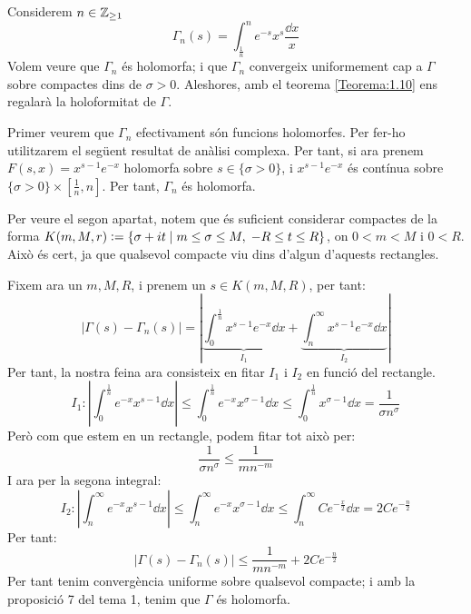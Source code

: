 \begin{pf}
    Considerem $n\in \mathbb Z_{\geq1}$
    \[
    \Gamma_n(s)=\int_{\frac{1}{n}}^n e^{-s}x^s\frac{\dd x}{x}
    \]
    Volem veure que $\Gamma_n$ és holomorfa; i que $\Gamma_n$ convergeix uniformement cap a $\Gamma$ sobre compactes dins de $\sigma>0$. Aleshores, amb el teorema \ref{Teorema:1.10} ens regalarà la holoformitat de $\Gamma$.\par
    \vspace{10mm}
    Primer veurem que $\Gamma _n$ efectivament són funcions holomorfes. Per fer-ho utilitzarem el següent resultat de anàlisi complexa.
    Per tant, si ara prenem $F(s,x)=x^{s-1}e^{-x}$ holomorfa sobre $s\in\{\sigma>0\}$, i $x^{s-1}e^{-x}$ és contínua sobre $\{\sigma>0\}\times[\frac{1}{n},n]$. Per tant, $\Gamma_n$ és holomorfa.\par
    \vspace{10mm}

    Per veure el segon apartat, notem que és suficient considerar compactes de la forma $K(m,M,r)\vcentcolon=\{\sigma+it\;|\;m\leq \sigma \leq M,\; -R\leq t\leq R\}$, on $0<m<M$ i $0<R$. Això és cert, ja que qualsevol compacte viu dins d'algun d'aquests rectangles.\par
    Fixem ara un $m,M,R$, i prenem un $s\in K(m,M,R)$, per tant:
    \[
    \left|\Gamma(s)-\Gamma_n(s)\right|=
    \left|\underbrace{\int_0^\frac{1}{n} x^{s-1}e^{-x}\dd x}_{I_1}+\underbrace{\int_n^\infty x^{s-1}e^{-x}\dd x}_{I_2}\right|
    \]
    Per tant, la nostra feina ara consisteix en fitar $I_1$ i $I_2$ en funció del rectangle.
    \[
    I_1:\left|\int_0^{\frac{1}{n}}e^{-x}x^{s-1}\dd x\right|\leq
    \int_0^{\frac{1}{n}}e^{-x}x^{\sigma-1}\dd x\leq 
    \int_0^{\frac{1}{n}}x^{\sigma-1}\dd x=\frac{1}{\sigma n^{\sigma}}
    \]
    Però com que estem en un rectangle, podem fitar tot això per:
    \[
    \frac{1}{\sigma n^{\sigma}}\leq \frac{1}{mn^{-m}}
    \]
    I ara per la segona integral:
    \[
    I_2:\left|\int_{n}^\infty e^{-x}x^{s-1}\dd x\right|\leq
    \int_{n}^\infty e^{-x}x^{\sigma-1}\dd x\leq
    \int_n^\infty Ce^{-\frac{x}{2}}\dd x=2Ce^{-\frac{n}{2} }
    \]
    Per tant: 
    \[
    |\Gamma(s)-\Gamma_n(s)|\leq \frac{1}{mn^{-m}}+2Ce^{-\frac{n}{2}}
    \]
    Per tant tenim convergència uniforme sobre qualsevol compacte; i amb la proposició 7 del tema 1, tenim que $\Gamma$ és holomorfa.
\end{pf}
